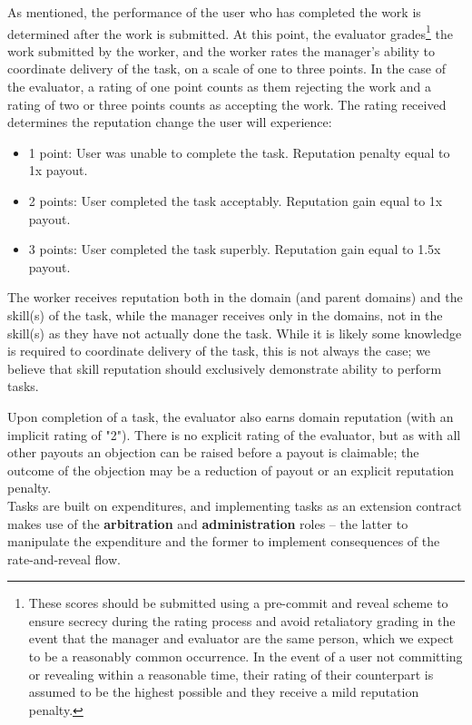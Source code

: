As mentioned, the performance of the user who has completed the work is determined after the work is submitted. At this point, the evaluator grades\footnote{These scores should be submitted using a pre-commit and reveal scheme to ensure secrecy during the rating process and avoid retaliatory grading in the event that the manager and evaluator are the same person, which we expect to be a reasonably common occurrence. In the event of a user not committing or revealing within a reasonable time, their rating of their counterpart is assumed to be the highest possible and they receive a mild reputation penalty.} the work submitted by the worker, and the worker rates the manager's ability to coordinate delivery of the task, on a scale of one to three points. In the case of the evaluator, a rating of one point counts as them rejecting the work and a rating of two or three points counts as accepting the work. The rating received determines the reputation change the user will experience:

\begin{itemize}
 \item[]1 point:\phantom{s} User was unable to complete the task. Reputation penalty equal to 1x payout.
 \item[]2 points: User completed the task acceptably. Reputation gain equal to 1x payout.
 \item[]3 points: User completed the task superbly. Reputation gain equal to 1.5x payout.
\end{itemize}

The worker receives reputation both in the domain (and parent domains) and the skill(s) of the task, while the manager receives only in the domains, not in the skill(s) as they have not actually done the task. While it is likely some knowledge is required to coordinate delivery of the task, this is not always the case; we believe that skill reputation should exclusively demonstrate ability to perform tasks.

Upon completion of a task, the evaluator also earns domain reputation (with an implicit rating of "2"). There is no explicit rating of the evaluator, but as with all other payouts an objection can be raised before a payout is claimable; the outcome of the objection may be a reduction of payout or an explicit reputation penalty. \\

Tasks are built on expenditures, and implementing tasks as an extension contract makes use of the \textbf{arbitration} and \textbf{administration} roles -- the latter to manipulate the expenditure and the former to implement consequences of the rate-and-reveal flow.

